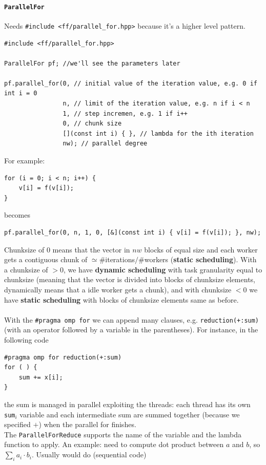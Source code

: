 \documentclass[10pt]{report}
\begin{document}
\paragraph{\texttt{ParallelFor}} Needs \texttt{\#include <ff/parallel\_for.hpp>} because it's a higher level pattern.
\begin{lstlisting}[style=myC]
#include <ff/parallel_for.hpp>

ParallelFor pf; //we'll see the parameters later

pf.parallel_for(0, // initial value of the iteration value, e.g. 0 if int i = 0
				n, // limit of the iteration value, e.g. n if i < n
				1, // step incremen, e.g. 1 if i++
				0, // chunk size
				[](const int i) { }, // lambda for the ith iteration
				nw); // parallel degree
\end{lstlisting}
For example:
\begin{lstlisting}[style=myC]
for (i = 0; i < n; i++) {
	v[i] = f(v[i]);
}
\end{lstlisting}
becomes
\begin{lstlisting}[style=myC]
pf.parallel_for(0, n, 1, 0,	[&](const int i) { v[i] = f(v[i]); }, nw);
\end{lstlisting}
Chunksize of 0 means that the vector in $nw$ blocks of equal size and each worker gets a contiguous chunk of $\simeq \#$iterations$/\#$workers (\textbf{static scheduling}). With a chunksize of $>0$, we have \textbf{dynamic scheduling} with task granularity equal to chunksize (meaning that the vector is divided into blocks of chunksize elements, dynamically means that a idle worker gets a chunk), and with chunksize $<0$ we have \textbf{static scheduling} with blocks of chunksize elements same as before.\\\\
With the \texttt{\#pragma omp for} we can append many clauses, e.g. \texttt{reduction(+:sum)} (with an operator followed by a variable in the parentheses). For instance, in the following code
\begin{lstlisting}[style=myC]
#pragma omp for reduction(+:sum)
for ( ) {
	sum += x[i];
}
\end{lstlisting}
the sum is managed in parallel exploiting the threads: each thread has its own \texttt{sum}$_i$ variable and each intermediate sum are summed together (because we specified $+$) when the parallel for finishes.\\
The \texttt{ParallelForReduce} supports the name of the variable and the lambda function to apply. An example: need to compute dot product between $a$ and $b$, so $\sum_i a_i\cdot b_i$. Usually would do (sequential code)
\end{document}
